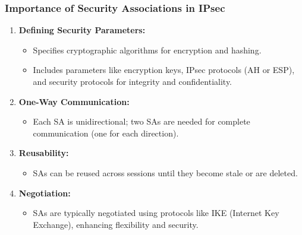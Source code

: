 \documentclass{beamer}
\begin{document}
\begin{frame}[fragile]
    \frametitle{Importance of Security Associations in IPsec}
    \begin{enumerate}
        \item \textbf{Defining Security Parameters:}
        \begin{itemize}
            \item Specifies cryptographic algorithms for encryption and hashing.
            \item Includes parameters like encryption keys, IPsec protocols (AH or ESP), and security protocols for integrity and confidentiality.
        \end{itemize}
        
        \item \textbf{One-Way Communication:}
        \begin{itemize}
            \item Each SA is unidirectional; two SAs are needed for complete communication (one for each direction).
        \end{itemize}
        
        \item \textbf{Reusability:}
        \begin{itemize}
            \item SAs can be reused across sessions until they become stale or are deleted.
        \end{itemize}
        
        \item \textbf{Negotiation:}
        \begin{itemize}
            \item SAs are typically negotiated using protocols like IKE (Internet Key Exchange), enhancing flexibility and security.
        \end{itemize}
    \end{enumerate}
\end{frame}
\end{document}

